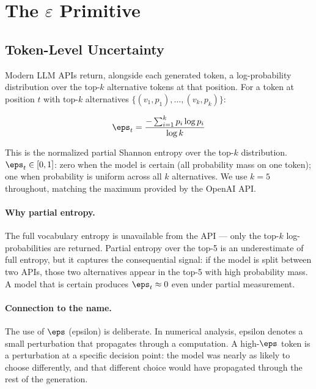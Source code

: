 \section{The \texorpdfstring{$\varepsilon$}{epsilon} Primitive}
\label{sec:epsilon}

\subsection{Token-Level Uncertainty}
\label{sec:eps-token}

Modern LLM APIs return, alongside each generated token, a log-probability
distribution over the top-$k$ alternative tokens at that position. For a
token at position $t$ with top-$k$ alternatives $\{(v_1, p_1), \ldots, (v_k, p_k)\}$:

\begin{equation}
  \eps_t = \frac{-\sum_{i=1}^{k} p_i \log p_i}{\log k}
  \label{eq:eps-token}
\end{equation}

This is the normalized partial Shannon entropy over the top-$k$ distribution.
$\eps_t \in [0, 1]$: zero when the model is certain (all probability mass on
one token); one when probability is uniform across all $k$ alternatives.
We use $k = 5$ throughout, matching the maximum provided by the OpenAI API.

\paragraph{Why partial entropy.} The full vocabulary entropy is unavailable
from the API --- only the top-$k$ log-probabilities are returned. Partial
entropy over the top-5 is an underestimate of full entropy, but it captures
the consequential signal: if the model is split between two APIs, those two
alternatives appear in the top-5 with high probability mass. A model that is
certain produces $\eps_t \approx 0$ even under partial measurement.

\paragraph{Connection to the name.} The use of $\eps$ (epsilon) is deliberate.
In numerical analysis, epsilon denotes a small perturbation that propagates
through a computation. A high-$\eps$ token is a perturbation at a specific
decision point: the model was nearly as likely to choose differently, and that
different choice would have propagated through the rest of the generation.

